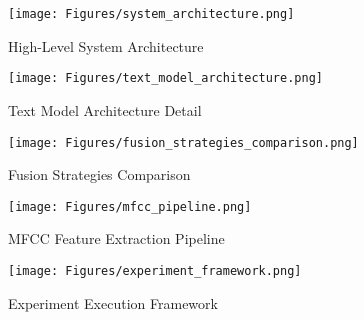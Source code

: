 
\begin{figure}[h]
    \centering
    \texttt{[image: Figures/system\_architecture.png]}
    \caption{High-Level System Architecture}
    \label{fig:system_architecture}
\end{figure}

\begin{figure}[h]
    \centering
    \texttt{[image: Figures/text\_model\_architecture.png]}
    \caption{Text Model Architecture Detail}
    \label{fig:text_model_architecture}
\end{figure}

\begin{figure}[h]
    \centering
    \texttt{[image: Figures/fusion\_strategies\_comparison.png]}
    \caption{Fusion Strategies Comparison}
    \label{fig:fusion_strategies_comparison}
\end{figure}

\begin{figure}[h]
    \centering
    \texttt{[image: Figures/mfcc\_pipeline.png]}
    \caption{MFCC Feature Extraction Pipeline}
    \label{fig:mfcc_pipeline}
\end{figure}

\begin{figure}[h]
    \centering
    \texttt{[image: Figures/experiment\_framework.png]}
    \caption{Experiment Execution Framework}
    \label{fig:experiment_framework}
\end{figure}

